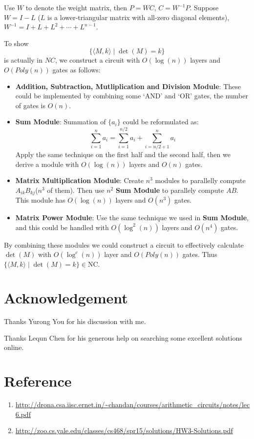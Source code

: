 \documentclass[paper=a4, fontsize=11pt]{scrartcl} %
\numberwithin{equation}{section} %
\numberwithin{figure}{section} %
\numberwithin{table}{section} %
\begin{document}
Use $W$ to denote the weight matrix, then $P = WC$, $C = W^{-1}P$.
Suppose $W = I - L$ ($L$ is a lower-triangular matrix with all-zero diagonal elements), $W^{-1} = I + L + L^2 + \cdots + L^{n-1}$.

To show $$\{\langle M, k\rangle \mid \det(M) = k\} $$ is actually in $NC$, we construct a circuit with $O(\log(n))$ layers and $O(Poly(n))$ gates as follows:

\begin{itemize}
	\item {\bf Addition, Subtraction, Mutliplication and Division Module}: 
	These could be implemented by combining some `AND' and `OR' gates, the number of gates is $O(n)$.
	\item {\bf Sum Module}: 
	Summation of $\{a_i\}$ could be reformulated as:
	$$\sum_{i=1}^n a_i = \sum_{i=1}^{n/2} a_i + \sum_{i = n/2+1}^{n} a_i $$
	Apply the same technique on the first half and the second half, then we derive a module with $O(\log(n))$ layers and $O(n)$ gates.
	\item {\bf Matrix Multiplication Module}:
	Create $n^3$ modules to parallelly compute $A_{ik}B_{kj}$($n^3$ of them). Then use $n^2$ {\bf Sum Module} to parallely compute $AB$. This module has $O(\log(n))$ layers and $O(n^3)$ gates. 
	\item {\bf Matrix Power Module}:
	Use the same technique we used in {\bf Sum Module}, and this could be handled with $O\left(\log^2(n)\right)$ layers and $O(n^4)$ gates.
\end{itemize}

By combining these modules we could construct a circuit to effectively calculate $\det(M)$ with $O\left(\log^c(n)\right)$ layer and $O(Poly(n))$ gates. Thus $\{\langle M, k\rangle \mid \det(M) = k\} \in \textrm{NC}$.

\section*{Acknowledgement}
Thanks Yurong You for his discussion with me.

Thanks Lequn Chen for his generous help on searching some excellent solutions online.

\section*{Reference}
\begin{enumerate}
	\item \url{http://drona.csa.iisc.ernet.in/~chandan/courses/arithmetic_circuits/notes/lec6.pdf}
	\item \url{http://zoo.cs.yale.edu/classes/cs468/spr15/solutions/HW3-Solutions.pdf}
\end{enumerate}
\end{document}
